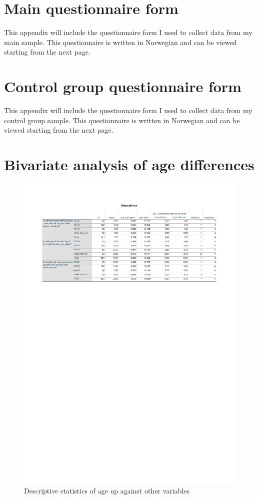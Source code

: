 \chapter{Main questionnaire form}
\label{app:questionnaire_form}
This appendix will include the questionnaire form I used to collect data from my main sample. This questionnaire is written in Norwegian and can be viewed starting from the next page. 


\chapter{Control group questionnaire form}
\label{app:controlgroup_questionnaire_form}
This appendix will include the questionnaire form I used to collect data from my control group sample. This questionnaire is written in Norwegian and can be viewed starting from the next page.


\chapter{Bivariate analysis of age differences}

\begin{figure}[!h]
    \centering
    \includegraphics[scale=0.7]{figures/tables/anova_age_desc.pdf}
    \caption{Descriptive statistics of age up against other variables}
    \label{fig:anova_age_desc}
\end{figure}

